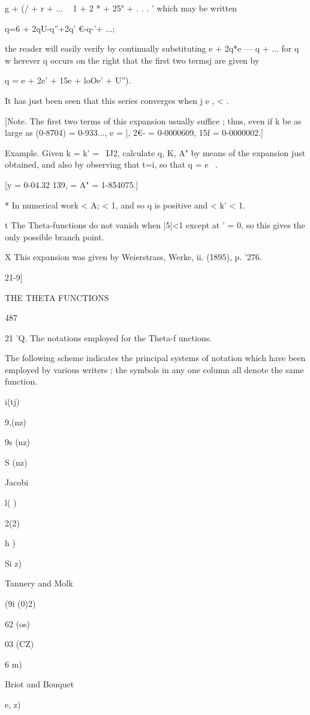 g + (/ + r + ... ~ 1 + 2 * + 25" + . . . ' which may be written

q=6 + 2qU-q''+2q' €-q-'+ ...;

the reader will easily verify by continually substituting e + 2q*e — q
+ ... for q w herever q occurs on the right that the first two termsj
are given by

q = e + 2e' + 15e + loOe' + U'').

It has just been seen that this series converges when j e , < .

[Note. The first two terms of this expansion usually suffice ; thus,
even if k be as large as (0-8704) = 0-933..., e = |, 2€- = 0-0000609,
15f = 0-0000002.]

Example. Given k = k' = \ IJ2, calculate q, K, A" by means of the
expansion just obtained, and also by observing that t=i, so that q =
e~ .

[y = 0-04.32 139, = A" = 1-854075.]

* In numerical work < A; < 1, and so q is positive and < k' < 1.

t The Theta-functions do not vanish when |5|<1 except at ' = 0, so
this gives the only possible branch point.

X This expansion was given by Weierstrass, Werke, ii. (1895), p. '276.

21-9]

THE THETA FUNCTIONS

487

21 'Q. The notations employed for the Theta-f unctions.

The following scheme indicates the principal systems of notation which
have been employed by various writers ; the symbols in any one column
all denote the same function.

 i(tj)

9,(nz)

9s (nz)

S (nz)

Jacobi

 l( )

 2(2)

h )

Si z)

Tannery and Molk

(9i (0)2)

62 (os)

03 (CZ)

6 m)

Briot and Bouquet

e, z)

